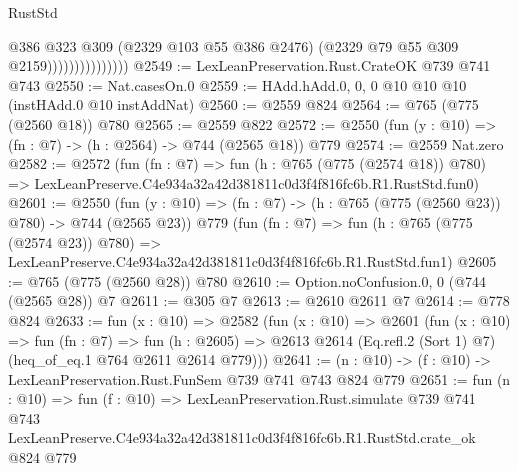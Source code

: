 \begin{lexlean}{RustStd}
\begin{coremodule}
                                @386
                                @323
                                @309
                                (@2329 @103 @55 @386 @2476)
                                (@2329 @79 @55 @309 @2159)))))))))))))))
@2549 := LexLeanPreservation.Rust.CrateOK @739 @741 @743
@2550 := Nat.casesOn.{0}
@2559 := HAdd.hAdd.{0, 0, 0} @10 @10 @10 (instHAdd.{0} @10 instAddNat)
@2560 := @2559 @824
@2564 := @765 (@775 (@2560 @18)) @780
@2565 := @2559 @822
@2572 := @2550 (fun (y : @10) => (fn : @7) -> (h : @2564) -> @744 (@2565 @18)) @779
@2574 := @2559 Nat.zero
@2582 := @2572
    (fun (fn : @7) =>
    fun (h : @765 (@775 (@2574 @18)) @780) =>
    LexLeanPreserve.C4e934a32a42d381811c0d3f4f816fc6b.R1.RustStd.fun0)
@2601 := @2550
    (fun (y : @10) => (fn : @7) -> (h : @765 (@775 (@2560 @23)) @780) -> @744 (@2565 @23))
    @779
    (fun (fn : @7) =>
    fun (h : @765 (@775 (@2574 @23)) @780) =>
    LexLeanPreserve.C4e934a32a42d381811c0d3f4f816fc6b.R1.RustStd.fun1)
@2605 := @765 (@775 (@2560 @28)) @780
@2610 := Option.noConfusion.{0, 0} (@744 (@2565 @28)) @7
@2611 := @305 @7
@2613 := @2610 @2611 @7
@2614 := @778 @824
@2633 := fun (x : @10) =>
  @2582
    (fun (x : @10) =>
    @2601
      (fun (x : @10) =>
      fun (fn : @7) =>
      fun (h : @2605) =>
      @2613 @2614 (Eq.refl.{2} (Sort 1) @7) (heq_of_eq.{1} @764 @2611 @2614 @779)))
@2641 := (n : @10) -> (f : @10) -> LexLeanPreservation.Rust.FunSem @739 @741 @743 @824 @779
@2651 := fun (n : @10) =>
  fun (f : @10) =>
  LexLeanPreservation.Rust.simulate
    @739
    @741
    @743
    LexLeanPreserve.C4e934a32a42d381811c0d3f4f816fc6b.R1.RustStd.crate_ok
    @824
    @779
\end{coremodule}
\end{lexlean}
